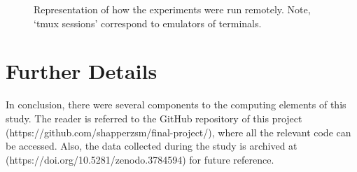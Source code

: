 \begin{figure}
    \centering
    \resizebox{\textwidth}{!}{}
    \caption{Representation of how the experiments were run remotely. Note, `tmux sessions' correspond to emulators of terminals.}\label{fig:restate_remote_comp}
\end{figure}

\section{Further Details}
In conclusion, there were several components to the computing elements of this
study. The reader is referred to the GitHub repository of this 
project \\ (https://github.com/shapperzsm/final-project/),
where all the relevant code can be accessed. Also, the data collected during the
study is archived at \\ (https://doi.org/10.5281/zenodo.3784594) for future reference.